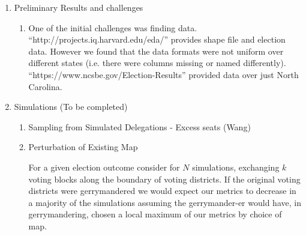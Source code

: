 \documentclass[10pt]{article}
\theoremstyle{definition}
\theoremstyle{remark}
\begin{document}
\begin{enumerate}
\begin{enumerate}
    \end{enumerate}
    \item Preliminary Results and challenges
    \begin{enumerate}
        \item One of the initial challenges was finding data.
        ``http://projects.iq.harvard.edu/eda/'' provides shape file and
        election data. However we found that the data formats were not uniform over
        different states (i.e. there were columns missing or named differently).
        ``https://www.ncsbe.gov/Election-Results'' provided data over just
        North Carolina. 


    \end{enumerate}

    \item Simulations (To be completed)
    \begin{enumerate}
        \item Sampling from Simulated Delegations - Excess seats (Wang)

        \item Perturbation of Existing Map

        For a given election outcome
        consider for $N$ simulations, exchanging $k$ voting blocks along the
        boundary of voting districts. If the original voting districts were
        gerrymandered we would expect our metrics to decrease in a majority of
        the simulations assuming the gerrymander-er would have, in
        gerrymandering, chosen a local maximum of our metrics by choice of map.

    \end{enumerate}
\end{enumerate}

\end{document}
